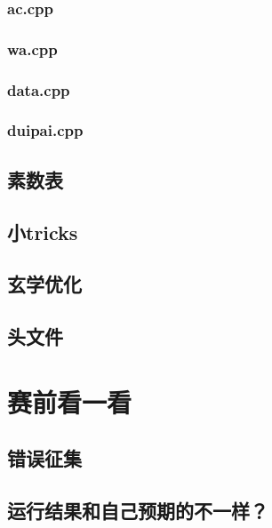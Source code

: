 \documentclass[10pt,a4paper]{article}
\begin{document}
	\subsubsection{ac.cpp}
	
	\subsubsection{wa.cpp}
	
	\subsubsection{data.cpp}
	
	\subsubsection{duipai.cpp}
	
	\subsection{素数表}
	
	\subsection{小tricks}
	
	\subsection{玄学优化}
	
	\subsection{头文件}
	
	\section{赛前看一看}
	\subsection{错误征集}
	
	\subsection{运行结果和自己预期的不一样？}
	
\end{document}
